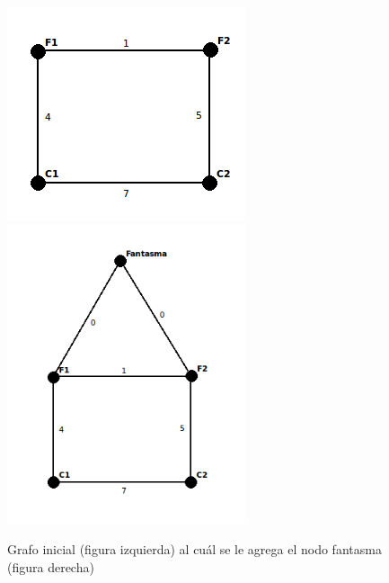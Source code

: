 \documentclass[a4paper, 10pt, twoside]{article}
\begin{document}
\begin{figure}[H]
\includegraphics[width=70mm]{../ejemplo_graficos/CosoDosSubconjuntos.png}
\includegraphics[width=70mm]{../ejemplo_graficos/CosoDosSubconjuntosConNodoFantasma.png}
\caption{Grafo inicial (figura izquierda) al cuál se le agrega el nodo fantasma (figura derecha)}
\end{figure} 
\end{document}
